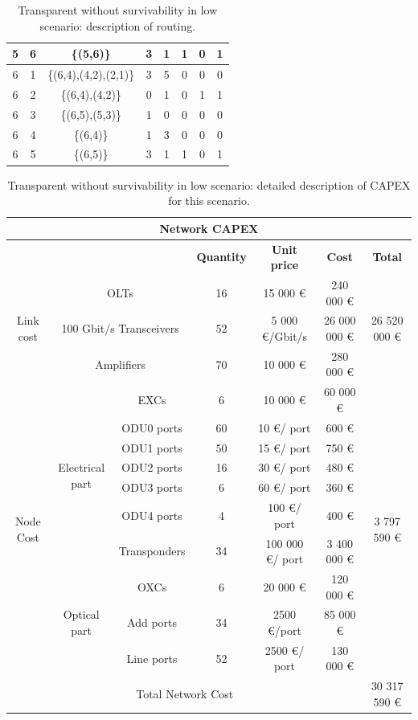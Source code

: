 \begin{table}[H]
\begin{tabular}{|c|c|c|c|c|c|c|c|}
		5 & 6 & \{(5,6)\} & 3 & 1 & 1 & 0 & 1 \\ \hline
		6 & 1 & \{(6,4),(4,2),(2,1)\} & 3 & 5 & 0 & 0 & 0 \\ \hline
		6 & 2 & \{(6,4),(4,2)\} & 0 & 1 & 0 & 1 & 1 \\ \hline
		6 & 3 & \{(6,5),(5,3)\} & 1 & 0 & 0 & 0 & 0 \\ \hline
		6 & 4 & \{(6,4)\} & 1 & 3 & 0 & 0 & 0 \\ \hline
		6 & 5 & \{(6,5)\} & 3 & 1 & 1 & 0 & 1 \\ \hline
	\end{tabular}
	\caption{Transparent without survivability in low scenario: description of routing.}
\end{table}
\begin{table}[H]
	\begin{tabular}{|c|c|c|c|c|c|c|}
		\hline
		\multicolumn{7}{|c|}{\textbf{Network CAPEX}} \\ \hline
		\multicolumn{3}{|c|}{} & \textbf{Quantity} & \textbf{Unit price} & \textbf{Cost} & \textbf{Total} \\ \hline
		\multirow{3}{*}{Link cost} & \multicolumn{2}{c|}{OLTs} & 16 & 15 000 \euro & 240 000 \euro & \multirow{3}{*}{26 520 000 \euro} \\ \cline{2-6}
		& \multicolumn{2}{c|}{100 Gbit/s Transceivers} & 52 & 5 000 \euro /Gbit/s & 26 000 000 \euro &  \\ \cline{2-6}
		& \multicolumn{2}{c|}{Amplifiers} & 70 & 10 000 \euro & 280 000 \euro &  \\ \hline
		\multirow{10}{*}{Node Cost} & \multirow{7}{*}{Electrical part} & EXCs & 6 & 10 000 \euro & 60 000 \euro & \multirow{10}{*}{3 797 590 \euro} \\ \cline{3-6}
		&  & ODU0 ports & 60 & 10 \euro/ port & 600 \euro &  \\ \cline{3-6}
		&  & ODU1 ports & 50 & 15 \euro/ port & 750 \euro &  \\ \cline{3-6}
		&  & ODU2 ports & 16 & 30 \euro/ port & 480 \euro &  \\ \cline{3-6}
		&  & ODU3 ports & 6 & 60 \euro/ port & 360 \euro &  \\ \cline{3-6}
		&  & ODU4 ports & 4 & 100 \euro/ port & 400 \euro &  \\ \cline{3-6}
		&  & Transponders & 34 & 100 000 \euro/ port & 3 400 000 \euro &  \\ \cline{2-6}
		& \multirow{3}{*}{Optical part} & OXCs & 6 & 20 000 \euro & 120 000 \euro &  \\ \cline{3-6}
		&  & Add ports & 34 & 2500 \euro/port & 85 000 \euro &  \\ \cline{3-6}
		&  & Line ports & 52 & 2500 \euro/ port & 130 000 \euro &  \\ \hline
		\multicolumn{6}{|c|}{Total Network Cost} & 30 317 590 \euro \\ \hline
	\end{tabular}
	\caption{Transparent without survivability in low scenario: detailed description of CAPEX for this
		scenario.}
\end{table}

